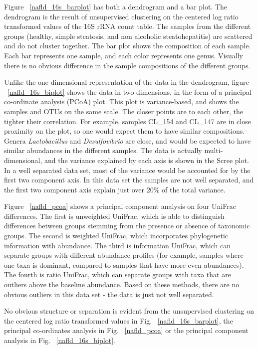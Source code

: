 Figure ~\ref{nafld_16s_barplot} has both a dendrogram and a bar plot. The dendrogram is the result of unsupervised clustering on the centered log ratio transformed values of the 16S rRNA count table. The samples from the different groups (healthy, simple steatosis, and non alcoholic steatohepatitis) are scattered and do not cluster together. The bar plot shows the composition of each sample. Each bar represents one sample, and each color represents one genus. Visually there is no obvious difference in the sample compositions of the different groups.

Unlike the one dimensional representation of the data in the dendrogram, figure ~\ref{nafld_16s_biplot} shows the data in two dimensions, in the form of a principal co-ordinate analysis (PCoA) plot. This plot is variance-based, and shows the samples and OTUs on the same scale. The closer points are to each other, the tighter their correlation. For example, samples CL\_154 and CL\_147 are in close proximity on the plot, so one would expect them to have similar compositions. Genera \textit{Lactobacillus} and \textit{Desulfovibrio} are close, and would be expected to have similar abundances in the different samples. The data is actually multi-dimensional, and the variance explained by each axis is shown in the Scree plot. In a well separated data set, most of the variance would be accounted for by the first two component axis. In this data set the samples are not well separated, and the first two component axis explain just over 20\% of the total variance.

Figure ~\ref{nafld_pcoa} shows a principal component analysis on four UniFrac differences. The first is unweighted UniFrac, which is able to distinguish differences between groups stemming from the presence or absence of taxonomic groups. The second is weighted UniFrac, which incorporates phylogenetic information with abundance. The third is information UniFrac, which can separate groups with different abundance profiles (for example, samples where one taxa is dominant, compared to samples that have more even abundances). The fourth is ratio UniFrac, which can separate groups with taxa that are outliers above the baseline abundance. Based on these methods, there are no obvious outliers in this data set - the data is just not well separated.

No obvious structure or separation is evident from the unsupervised clustering on the centered log ratio transformed values in Fig. ~\ref{nafld_16s_barplot}, the principal co-ordinates analysis in Fig. ~\ref{nafld_pcoa} or the principal component analysis in Fig. ~\ref{nafld_16s_biplot}.

